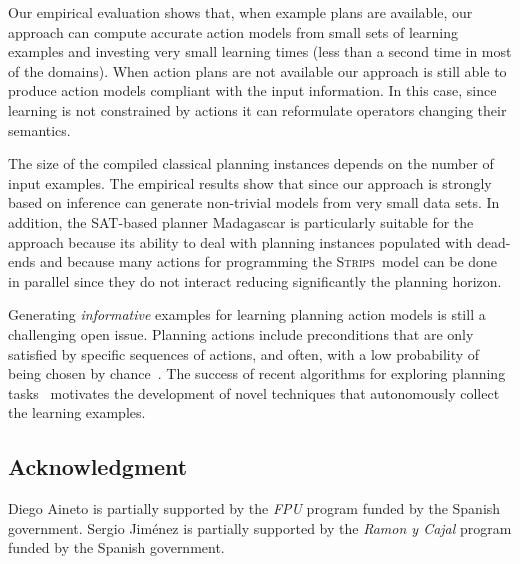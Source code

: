 \documentclass[letterpaper]{article} %
\newcommand{\strips}{\textsc{Strips}}     %
\begin{document}
Our empirical evaluation shows that, when example plans are available, our approach can compute accurate action models from small sets of learning examples and investing very small learning times (less than a second time in most of the domains). When action plans are not available our approach is still able to produce action models compliant with the input information. In this case, since learning is not constrained by actions it can reformulate operators changing their semantics. %

The size of the compiled classical planning instances depends on the number of input examples. The empirical results show that since our approach is strongly based on inference can generate non-trivial models from very small data sets. In addition, the SAT-based planner {\sc Madagascar} is particularly suitable for the approach because its ability to deal with planning instances populated with dead-ends and because many actions for programming the \strips\ model can be done in parallel since they do not interact reducing significantly the planning horizon. 

Generating {\em informative} examples for learning planning action models is still a challenging open issue. Planning actions include preconditions that are only satisfied by specific sequences of actions, and often, with a low probability of being chosen by chance~\cite{fern2004learning}. The success of recent algorithms for exploring planning tasks~\cite{geffner:novelty:IJCAI17} motivates the development of novel techniques that autonomously collect the learning examples. 

\begin{small}
\subsection*{Acknowledgment}
Diego Aineto is partially supported by the {\it FPU} program funded by the Spanish government. Sergio Jim\'enez is partially supported by the {\it Ramon y Cajal} program funded by the Spanish government.
\end{small}

\newpage



\end{document}
